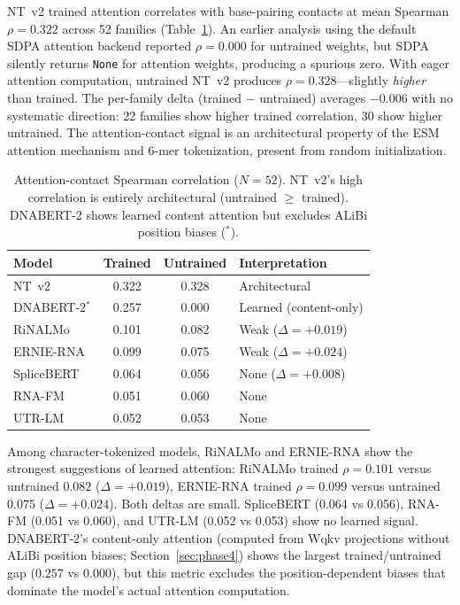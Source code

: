 \documentclass[11pt]{article}
\begin{document}
NT~v2 trained attention correlates with base-pairing contacts at mean
Spearman $\rho = 0.322$ across 52 families
(Table~\ref{tab:attention}).  An earlier analysis using the default
SDPA attention backend reported $\rho = 0.000$ for untrained weights,
but SDPA silently returns \texttt{None} for attention weights,
producing a spurious zero.  With eager attention computation,
untrained NT~v2 produces $\rho = 0.328$---slightly \emph{higher} than
trained.  The per-family delta (trained $-$ untrained) averages
$-0.006$ with no systematic direction: 22 families show higher trained
correlation, 30 show higher untrained.  The attention-contact signal
is an architectural property of the ESM attention mechanism and
6-mer tokenization, present from random initialization.

\begin{table}[t]
\centering
\caption{Attention-contact Spearman correlation ($N = 52$).  NT~v2's
  high correlation is entirely architectural (untrained $\geq$
  trained).  DNABERT-2 shows learned content attention but excludes
  ALiBi position biases ($^*$).}
\label{tab:attention}
\begin{tabular}{@{}lccl@{}}
\toprule
\textbf{Model} & \textbf{Trained} & \textbf{Untrained} &
  \textbf{Interpretation} \\
\midrule
NT~v2      & 0.322 & 0.328 & Architectural \\
DNABERT-2$^*$  & 0.257 & 0.000 & Learned (content-only) \\
RiNALMo    & 0.101 & 0.082 & Weak ($\Delta = +0.019$) \\
ERNIE-RNA  & 0.099 & 0.075 & Weak ($\Delta = +0.024$) \\
SpliceBERT & 0.064 & 0.056 & None ($\Delta = +0.008$) \\
RNA-FM     & 0.051 & 0.060 & None \\
UTR-LM     & 0.052 & 0.053 & None \\
\bottomrule
\end{tabular}
\end{table}

Among character-tokenized models, RiNALMo and ERNIE-RNA show the
strongest suggestions of learned attention: RiNALMo trained $\rho =
0.101$ versus untrained $0.082$ ($\Delta = +0.019$), ERNIE-RNA
trained $\rho = 0.099$ versus untrained $0.075$ ($\Delta = +0.024$).
Both deltas are small.  SpliceBERT (0.064 vs 0.056), RNA-FM (0.051
vs 0.060), and UTR-LM (0.052 vs 0.053) show no learned signal.
DNABERT-2's content-only attention (computed from Wqkv projections
without ALiBi position biases; Section~\ref{sec:phase4}) shows the
largest trained/untrained gap ($0.257$ vs $0.000$), but this metric
excludes the position-dependent biases that dominate the model's
actual attention computation.
\end{document}
